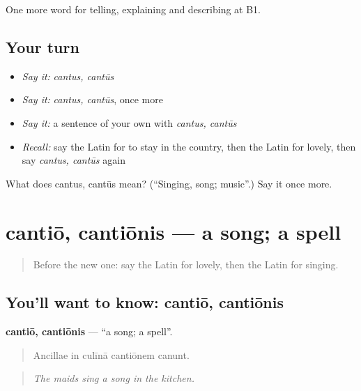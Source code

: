 \begin{grammarlens}[title={What you've built}]
One more word for telling, explaining and describing at B1.
\end{grammarlens}

\subsection*{Your turn}
\begin{itemize}
\raggedright
  \item \emph{Say it:} \emph{cantus, cantūs}
  \item \emph{Say it:} \emph{cantus, cantūs}, once more
  \item \emph{Say it:} a sentence of your own with \emph{cantus, cantūs}
  \item \emph{Recall:} say the Latin for to stay in the country, then the Latin for lovely, then say \emph{cantus, cantūs} again
\end{itemize}

\begin{tcolorbox}[breakable,colback=teal!4,colframe=teal!35!black,title={Before you move on}]
What does cantus, cantūs mean? (\textquotedblleft{}Singing, song; music\textquotedblright{}.) Say it once more.
\end{tcolorbox}
\section[cantiō, cantiōnis]{cantiō, cantiōnis — a song; a spell}

\label{lesson:LA-C543-cantio}



\begin{quote}
Before the new one: say the Latin for lovely, then the Latin for singing.
\end{quote}

\subsection*{You'll want to know: cantiō, cantiōnis}
\textbf{cantiō, cantiōnis} — \textquotedblleft{}a song; a spell\textquotedblright{}.

\begin{quote}
Ancillae in culīnā cantiōnem canunt.
\end{quote}

\begin{quote}
\emph{The maids sing a song in the kitchen.}
\end{quote}

